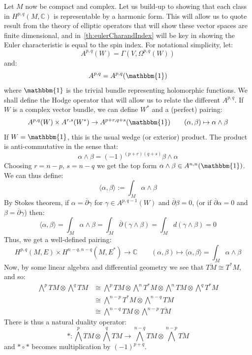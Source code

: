 \documentclass{book}
\newcommand{\C}{{\mathbb{C}}}
\begin{document}
Let $M$ now be compact and complex. Let us build-up to showing that each class in $H^{p,q}(M, \C)$ is
representable by a harmonic form. This will allow us to quote result from the theory of elliptic operators
that will show these vector spaces are finite dimensional, and in~\cref{th:eulerCharandIndex} will be key in
showing the Euler characteristic is equal to the spin index. For notational simplicity, let:
\[
  A^{p,q}(W) = \Gamma(V, \Omega^{p,q}(W))
\]
and:
\[
  A^{p,q} = A^{p,q}(\mathbbm{1})
\]
where $\mathbbm{1}$ is the trivial bundle representing holomorphic functions. We shall define the Hodge
operator that will allow us to relate the different $A^{p,q}$. If $W$ is a complex vector bundle, we can define $W^*$ and a (perfect) pairing:
\[
  A^{p,q}(W) \times A^{r,s}(W^*) \to A^{p+r, q+s}(\mathbbm{1}) \qquad (\alpha,\beta) \mapsto \alpha\wedge
\beta
\]
If $W = \mathbbm{1}$, this is the usual wedge (or exterior) product. The product is anti-commutative in the
sense that:
\[
  \alpha \wedge \beta = (-1)^{(p+r)(q+s)} \beta \wedge  \alpha
\]
Choosing $r = n-p$, $s = n-q$ we get the top form $\alpha \wedge  \beta \in A^{n,n}(\mathbbm{1})$. We can
thus define:
\[
  \langle \alpha,\beta \rangle := \int_M \alpha \wedge \beta
\]
By Stokes theorem, if $\alpha = \overline{\partial}\gamma$ for $\gamma \in A^{p, q-1}(W)$ and
$\overline{\partial}\beta = 0$, (or if $\overline{\partial}\alpha = 0$ and $\beta
= \overline{\partial}\gamma$) then:
\[
  \langle \alpha,\beta \rangle = \int_M \alpha \wedge \beta = \int_M \overline{\partial}(\gamma \wedge \beta)
  = \int_M d \left(\gamma \wedge  \beta\right) = 0
\]
Thus, we get a well-defined pairing:
\[
  H^{p,q}(M,E) \times H^{n-q, n-q}(M, E^*) \to \C\qquad (\alpha, \beta) \mapsto \langle \alpha,\beta \rangle
  = \int_M \alpha \wedge  \beta
\]
Now, by some linear algebra and differential geometry we see that $\overline{TM} \cong T^*M$, and so:
\begin{align*}
\bigwedge^p TM \otimes \bigwedge^q TM &\cong \bigwedge^p TM \otimes \bigwedge^n T^*M \otimes \bigwedge^n TM \otimes \bigwedge^q T^*M \\
&\cong \bigwedge^{n-p} T^*M \otimes \bigwedge^{n-q} TM \\
&\cong \bigwedge^{n-q} TM \otimes \bigwedge^{n-p} \overline{TM}
\end{align*}
There is thus a natural duality operator:
\[
  *: \bigwedge^p TM \otimes \bigwedge^q TM \to \bigwedge^{n-q} TM \otimes \bigwedge^{n-p} \overline{TM}
\]
and $*\circ *$ becomes multiplication by $(-1)^{p+q}$.
\end{document}
